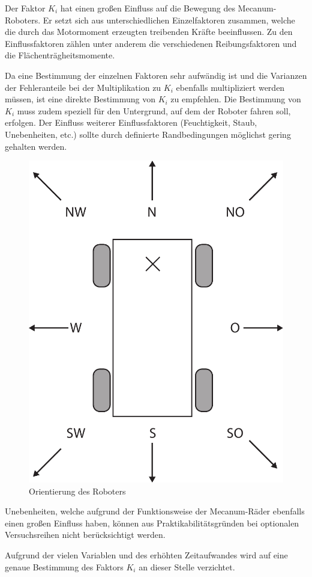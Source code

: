 Der Faktor $K_i$ hat einen großen Einfluss auf die Bewegung des Mecanum-Roboters. Er setzt sich aus unterschiedlichen Einzelfaktoren zusammen, welche die durch das Motormoment erzeugten treibenden Kräfte beeinflussen. Zu den Einflussfaktoren zählen unter anderem die verschiedenen Reibungsfaktoren und die Flächenträgheitsmomente. 

Da eine Bestimmung der einzelnen Faktoren sehr aufwändig ist und die Varianzen der Fehleranteile  bei der Multiplikation zu $K_i$ ebenfalls multipliziert werden müssen, ist eine direkte Bestimmung von $K_i$ zu empfehlen.
Die Bestimmung von $K_i$ muss zudem speziell für den Untergrund, auf dem der Roboter fahren soll, erfolgen. Der Einfluss weiterer Einflussfaktoren (Feuchtigkeit, Staub, Unebenheiten, etc.) sollte durch definierte Randbedingungen möglichst gering gehalten werden. 

\begin{figure}[H]
    \centering
    \includegraphics[width=.4\textwidth]{Abbildungen/Himmelsrichtungen}
    \caption{Orientierung des Roboters}
    \label{fig:himmel}
  \end {figure}

Unebenheiten, welche aufgrund der Funktionsweise der Mecanum-Räder ebenfalls einen großen Einfluss haben, können aus Praktikabilitätsgründen bei optionalen Versuchsreihen nicht berücksichtigt werden. 

Aufgrund der vielen Variablen und des erhöhten Zeitaufwandes wird auf eine genaue Bestimmung des Faktors $K_i$ an dieser Stelle verzichtet. 












